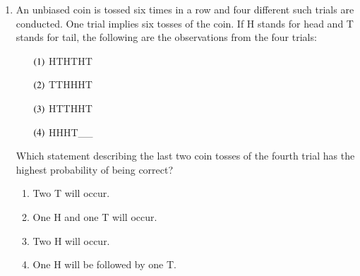 \documentclass[journal,12pt,onecolumn]{IEEEtran}
\theoremstyle{remark}
\begin{document}
\begin{enumerate}
\hfill{}

\begin{enumerate}
\end{enumerate}

\item An unbiased coin is tossed six times in a row and four different such trials are conducted. One trial implies six tosses of the coin. If H stands for head and T stands for tail, the following are the observations from the four trials:
\begin{enumerate}
    \item[$\left(1\right)$] HTHTHT
    \item[$\left(2\right)$] TTHHHT
    \item[$\left(3\right)$] HTTHHT
    \item[$\left(4\right)$] HHHT\_\_
\end{enumerate}
Which statement describing the last two coin tosses of the fourth trial has the highest probability of being correct?

\hfill{}

\begin{enumerate}
\item Two T will occur.
\item One H and one T will occur.
\item Two H will occur.
\item One H will be followed by one T.
\end{enumerate}
\end{enumerate}
\end{document}
